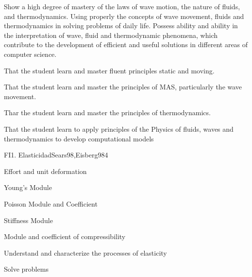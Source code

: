 \begin{syllabus}


\begin{justification}
Show a high degree of mastery of the laws of wave motion, the nature of fluids, and thermodynamics. Using properly the concepts of wave movement, fluids and thermodynamics in solving problems of daily life. Possess ability and ability in the interpretation of wave, fluid and thermodynamic phenomena, which contribute to the development of efficient and useful solutions in different areas of computer science.
\end{justification}

\begin{goals}
\item  That the student learn and master fluent principles static and moving.
\item  That the student learn and master the principles of MAS, particularly the wave movement.
\item  Thar the student learn and master the principles of thermodynamics.
\item  That the student learn to apply principles of the Physics of fluids, waves and thermodynamics to develop computational models
\end{goals}

\begin{outcomes}
\end{outcomes}

\begin{unit}{FI1. Elasticidad}{Sears98,Eisberg98}{4}
\begin{topics}
         \item  Effort and unit deformation
	 \item  Young's Module
         \item  Poisson Module and Coefficient
	 \item  Stiffness Module
         \item  Module and coefficient of compressibility
   \end{topics}

   \begin{unitgoals}
         \item  Understand and characterize the processes of elasticity
         \item  Solve problems
   \end{unitgoals}
\end{unit}


\end{syllabus}
